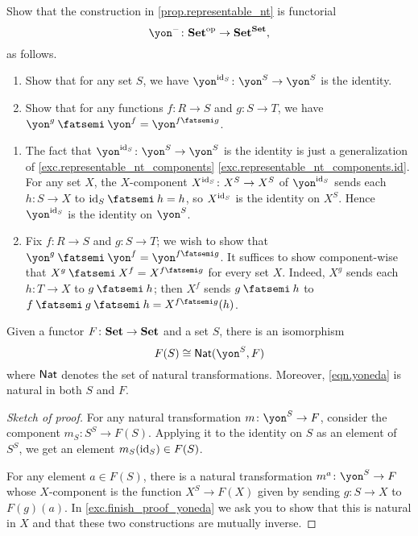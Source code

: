 \documentclass[Book-Poly]{subfiles}
\begin{document}
\begin{exercise} \label{exc.representable_nt_functorial}
Show that the construction in \cref{prop.representable_nt} is functorial
\begin{equation}
\yon^-\colon\smset\op\to\smset^\smset,
\end{equation}
as follows.
\begin{enumerate}
	\item Show that for any set $S$, we have $\yon^{\id_S}\colon\yon^S\to\yon^S$ is the identity.
	\item Show that for any functions $f\colon R\to S$ and $g\colon S\to T$, we have $\yon^g\then\yon^f=\yon^{f\then g}$.
\qedhere
\end{enumerate}

\begin{solution}
\begin{enumerate}
    \item The fact that $\yon^{\id_S}\colon\yon^S\to\yon^S$ is the identity is just a generalization of \cref{exc.representable_nt_components} \cref{exc.representable_nt_components.id}.
    For any set $X$, the $X$-component $X^{\mathrm{id}_S} \colon X^S \to X^S$ of $\yon^{\id_S}$ sends each $h \colon S \to X$ to $\id_S \then h = h$, so $X^{\mathrm{id}_S}$ is the identity on $X^S$.
    Hence $\yon^{\id_S}$ is the identity on $\yon^S$.
    \item Fix $f \colon R \to S$ and $g \colon S \to T$; we wish to show that $\yon^g \then \yon^f = \yon^{f \then g}$.
    It suffices to show component-wise that $X^g \then X^f = X^{f \then g}$ for every set $X$.
    Indeed, $X^g$ sends each $h \colon T \to X$ to $g \then h$; then $X^f$ sends $g \then h$ to $f \then g \then h = X^{f \then g}(h)$.
\end{enumerate}
\end{solution}
\end{exercise}

\begin{lemma}\label{lemma.yoneda}
Given a functor $F\colon\mathbf{Set}\to\mathbf{Set}$ and a set $S$, there is an isomorphism
\begin{equation}\label{eqn.yoneda}
F(S)\cong\nat(\yon^S,F)
\end{equation}
where $\mathsf{Nat}$ denotes the set of natural transformations. Moreover, \eqref{eqn.yoneda} is natural in both $S$ and $F$.
\end{lemma}
\begin{proof}[Sketch of proof]
For any natural transformation $m\colon\yon^S\to F$, consider the component $m_S\colon S^S\to F(S)$. Applying it to the identity on $S$ as an element of $S^S$, we get an element $m_S(\mathrm{id}_S)\in F(S)$.

For any element $a\in F(S)$, there is a natural transformation $m^a\colon\yon^S\to F$ whose $X$-component is the function $X^S\to F(X)$ given by sending $g\colon S\to X$ to $F(g)(a)$. In \cref{exc.finish_proof_yoneda} we ask you to show that this is natural in $X$ and that these two constructions are mutually inverse.
\end{proof}
\end{document}

